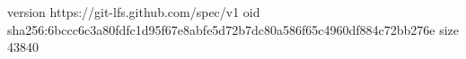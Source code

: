 version https://git-lfs.github.com/spec/v1
oid sha256:6bccc6c3a80fdfc1d95f67e8abfe5d72b7dc80a586f65c4960df884c72bb276e
size 43840

